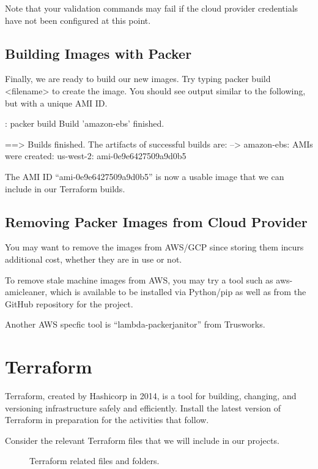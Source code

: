 \justify{}
Note that your validation commands may fail if the cloud provider
credentials have not been configured at this point.

\subsection{Building Images with Packer}

\justify{}
Finally, we are ready to build our new images. Try typing
packer build \textless{}filename\textgreater{} to create the image. You
should see output similar to the following, but with a unique AMI ID.

\begin{mybox}{\thetcbcounter: packer build}
Build 'amazon-ebs' finished.

==> Builds finished. The artifacts of successful builds are:
--> amazon-ebs: AMIs were created:
    us-west-2: ami-0e9e6427509a9d0b5
\end{mybox}

\justify{}
The AMI ID ``ami-0e9e6427509a9d0b5'' is now a usable image that we can
include in our Terraform builds.

\subsection{Removing Packer Images from Cloud Provider}

\justify{}
You may want to remove the images from AWS/GCP since storing them incurs
additional cost, whether they are in use or not.

\justify{}
To remove stale machine images from AWS, you may try a tool such as
aws-amicleaner, which is available to be installed via Python/pip as well as from the
GitHub repository for the project.

\jusitfy
Another AWS specfic tool is ``lambda-packerjanitor'' from Trusworks.

\section{Terraform}
\justify{}
Terraform, created by Hashicorp in 2014, is a tool for building, changing, and
versioning infrastructure safely and efficiently. Install the latest version of
Terraform in preparation for the activities that follow.

\justify{}
Consider the relevant Terraform files that we will include in our
projects.

\begin{figure}[!htb]
	
	\caption{Terraform related files and folders.}
\label{terrafiles}
\end{figure}

